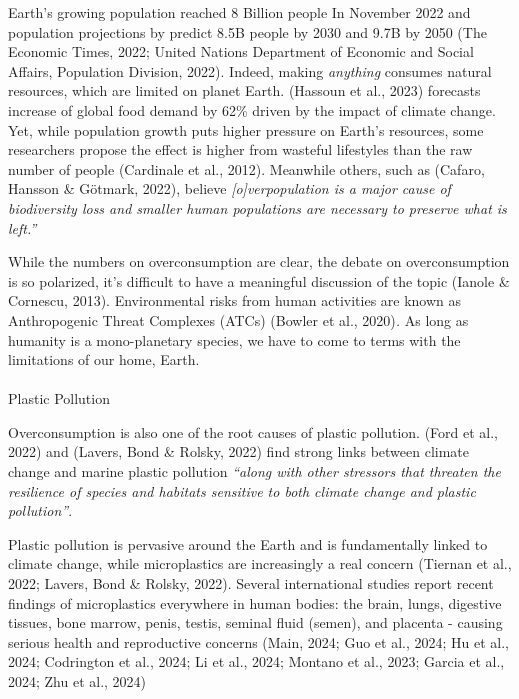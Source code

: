 \documentclass[
  letterpaper,
  DIV=11,
  numbers=noendperiod]{scrartcl}
\makeatletter
\let\oldparagraph\paragraph
\renewcommand{\paragraph}{
    \@ifstar
      \xxxParagraphStar
      \xxxParagraphNoStar
  }
\newcommand{\xxxParagraphStar}[1]{\oldparagraph*{#1}\mbox{}}
\newcommand{\xxxParagraphNoStar}[1]{\oldparagraph{#1}\mbox{}}
\makeatother
\begin{document}
Earth's growing population reached 8 Billion people In November 2022 and
population projections by predict 8.5B people by 2030 and 9.7B by 2050
(The Economic Times, 2022; United Nations Department of Economic and
Social Affairs, Population Division, 2022). Indeed, making
\emph{anything} consumes natural resources, which are limited on planet
Earth. (Hassoun et al., 2023) forecasts increase of global food demand
by 62\% driven by the impact of climate change. Yet, while population
growth puts higher pressure on Earth's resources, some researchers
propose the effect is higher from wasteful lifestyles than the raw
number of people (Cardinale et al., 2012). Meanwhile others, such as
(Cafaro, Hansson \& Götmark, 2022), believe \emph{{[}o{]}verpopulation
is a major cause of biodiversity loss and smaller human populations are
necessary to preserve what is left.''}

While the numbers on overconsumption are clear, the debate on
overconsumption is so polarized, it's difficult to have a meaningful
discussion of the topic (Ianole \& Cornescu, 2013). Environmental risks
from human activities are known as Anthropogenic Threat Complexes (ATCs)
(Bowler et al., 2020)\emph{.} As long as humanity is a mono-planetary
species, we have to come to terms with the limitations of our home,
Earth.

\paragraph{Plastic Pollution}\label{plastic-pollution}

Overconsumption is also one of the root causes of plastic pollution.
(Ford et al., 2022) and (Lavers, Bond \& Rolsky, 2022) find strong links
between climate change and marine plastic pollution \emph{``along with
other stressors that threaten the resilience of species and habitats
sensitive to both climate change and plastic pollution''}.

Plastic pollution is pervasive around the Earth and is fundamentally
linked to climate change, while microplastics are increasingly a real
concern (Tiernan et al., 2022; Lavers, Bond \& Rolsky, 2022). Several
international studies report recent findings of microplastics everywhere
in human bodies: the brain, lungs, digestive tissues, bone marrow,
penis, testis, seminal fluid (semen), and placenta - causing serious
health and reproductive concerns (Main, 2024; Guo et al., 2024; Hu et
al., 2024; Codrington et al., 2024; Li et al., 2024; Montano et al.,
2023; Garcia et al., 2024; Zhu et al., 2024)
\end{document}
